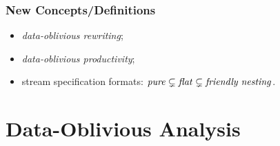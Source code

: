 \documentclass[10pt]{beamer}
\begin{document}
\begin{frame}%
  \frametitle{New Concepts/Definitions}


\begin{itemize}
  \item \emph{data-oblivious rewriting};
    \vspace*{0.15ex}
  \item \emph{data-oblivious productivity};
    \vspace*{0.15ex}
  \item stream specification formats: 
    $ \text{\emph{pure}}
        \subsetneq
      \text{\emph{flat}}
        \subsetneq 
      \text{\emph{friendly nesting}} $.
\end{itemize}


\begin{center}
\end{center}

\end{frame}%


\section[D-O Analysis]{Data-Oblivious Analysis}
\end{document}
